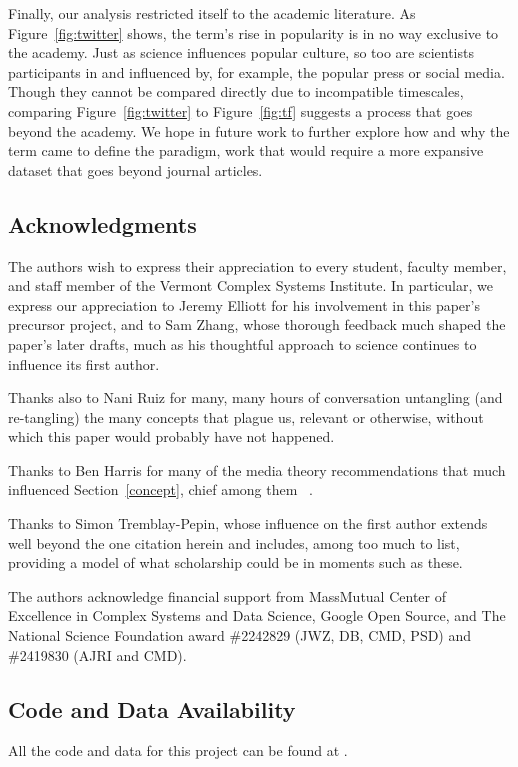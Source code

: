 \documentclass[          
 pre,
 twocolumn,
 twoside,
 superscriptaddress,
 amsmath,
 amssymb,                
 apsf
]{revtex4-2}
\begin{document}
Finally, our analysis restricted itself to the academic literature. As Figure~\ref{fig:twitter} shows, the term's rise in popularity is in no way exclusive to the academy. Just as science influences popular culture, so too are scientists participants in and influenced by, for example, the popular press or social media. Though they cannot be compared directly due to incompatible timescales, comparing Figure~\ref{fig:twitter} to Figure~\ref{fig:tf} suggests a process that goes beyond the academy. We hope in future work to further explore how and why the term came to define the paradigm, work that would require a more expansive dataset that goes beyond journal articles.

\subsection{Acknowledgments}
\label{acks}

The authors wish to express their appreciation to every student, faculty member, and staff member of the Vermont Complex Systems Institute. In particular, we express our appreciation to Jeremy Elliott for his involvement in this paper's precursor project, and to Sam Zhang, whose thorough feedback much shaped the paper's later drafts, much as his thoughtful approach to science continues to influence its first author. 

Thanks also to Nani Ruiz for many, many hours of conversation untangling (and re-tangling) the many concepts that plague us, relevant or otherwise, without which this paper would probably have not happened. 

Thanks to Ben Harris for many of the media theory recommendations that much influenced Section~\ref{concept}, chief among them ~\citet{williamsTelevisionTechnologyCultural2004}.

Thanks to Simon Tremblay-Pepin, whose influence on the first author extends well beyond the one citation herein and includes, among too much to list, providing a model of what scholarship could be in moments such as these.

The authors acknowledge financial support from MassMutual Center of Excellence in Complex Systems and Data Science, Google Open Source, and The National Science Foundation award \#2242829 (JWZ, DB, CMD, PSD) and \#2419830 (AJRI and CMD).

\subsection{Code and Data Availability}

All the code and data for this project can be found at \citet{gitrepo}.



\appendix
\end{document}
